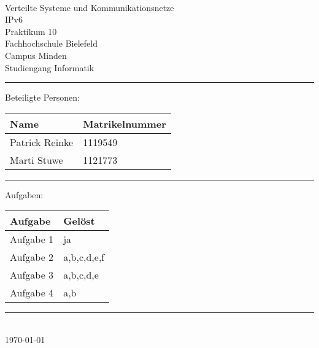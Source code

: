 


\begin{titlepage}
   \mbox{}\vspace{5\baselineskip}\\
   \sffamily\huge
   \centering
   {\Huge Verteilte Systeme und Kommunikationsnetze} \\
  IPv6 \\ \normalsize Praktikum 10
   \vspace{3\baselineskip}\\
   \rmfamily\Large
  Fachhochschule Bielefeld \\
  Campus Minden \\
  Studiengang Informatik
   \vspace{2\baselineskip}\\
\noindent\rule{15cm}{0.4pt}
Beteiligte Personen:
\begin{table}[H]
	\tablestyle
	\begin{tabular}{*{2}{v{0.45\textwidth}}}
		\hline
		\textbf{Name} &
		\textbf{Matrikelnummer} \tabularnewline
		\hline
		Patrick Reinke  & 1119549 \tabularnewline
		Marti Stuwe  & 1121773 \tabularnewline
	\end{tabular}
\end{table}

\centering
\noindent\rule{15cm}{0.4pt}
{\Large Aufgaben:}
\begin{table}[H]
	\tablestyle
	\begin{tabular}{*{2}{v{0.45\textwidth}}}
		\hline
		\textbf{Aufgabe} &
		\textbf{Gelöst} \tabularnewline
		\hline
		Aufgabe 1 & ja \tabularnewline
		Aufgabe 2 & a,b,c,d,e,f \tabularnewline
		Aufgabe 3 & a,b,c,d,e \tabularnewline
		Aufgabe 4 & a,b \tabularnewline
	\end{tabular}
\end{table}
   \noindent\rule{15cm}{0.4pt}
      \vspace{1\baselineskip}\\
   \today
\end{titlepage}

